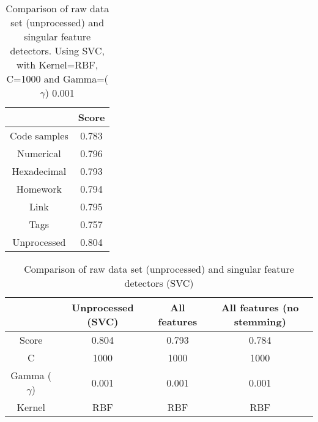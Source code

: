 \begin{table}[!h]%
	\centering
	\begin{tabular}{| c | c |}
		\hline
		~ 				& Score	\\ \hline
		Code samples 	& 0.783	\\ \hline
		Numerical		& 0.796	\\ \hline
		Hexadecimal		& 0.793	\\ \hline
		Homework 		& 0.794	\\ \hline
		Link			& 0.795	\\ \hline
		Tags			& 0.757	\\ \hline
		Unprocessed		& 0.804 \\ \hline
	\end{tabular}
	\caption{Comparison of raw data set (unprocessed) and singular feature detectors. Using SVC, with Kernel=RBF, C=1000 and Gamma=($\gamma$) 0.001}
	\label{tab:singular_feature_detector_so}
\end{table}


\begin{table}[!h]%
	\centering
	\begin{tabular}{| c | c | c | c |}
		\hline
		~ 					& Unprocessed (SVC)	& All features	& All features (no stemming)	\\ \hline
		Score 				& 0.804				& 0.793			& 0.784							\\ \hline
		C					& 1000				& 1000			& 1000							\\ \hline
		Gamma ($\gamma$)	& 0.001				& 0.001			&  0.001							\\ \hline
		Kernel				& RBF				& RBF			& RBF							\\ \hline
	\end{tabular}
	\caption{Comparison of raw data set (unprocessed) and singular feature detectors (SVC)}
	\label{tab:unprocessed_vs_all_feature_detectors_svc_so}
\end{table}

